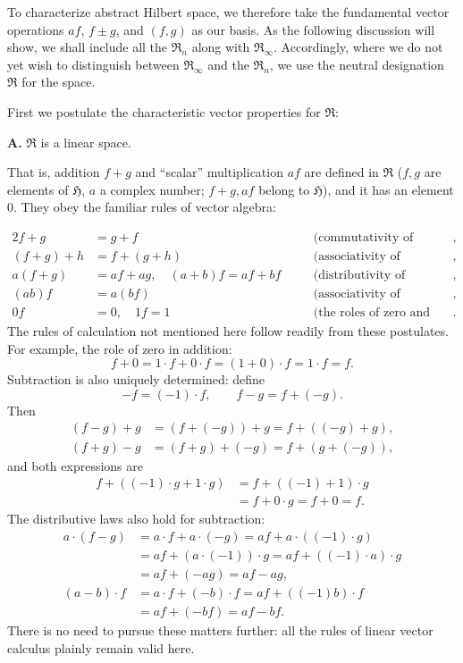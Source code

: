 \documentclass[fontsize=13pt,twoside,openany,headings=normal,parskip=false,bookmarkpackage=false,DIV=calc]{scrbook}
\begin{document}
To characterize abstract Hilbert space, we therefore take the fundamental vector operations $af$, $f\pm g$, and $(f,g)$ as our basis. As the following discussion will show, we shall include all the $\mathfrak{R}_n$ along with $\mathfrak{R}_\infty$. Accordingly, where we do not yet wish to distinguish between $\mathfrak{R}_\infty$ and the $\mathfrak{R}_n$, we use the neutral designation $\mathfrak{R}$ for the space.

First we postulate the characteristic vector properties for $\mathfrak{R}$:

\leavevmode{}\textbf{A.}\label{ax:II.A} $\mathfrak{R}$ is a linear space.

That is, addition $f+g$ and ``scalar'' multiplication $af$ are defined in $\mathfrak{R}$ ($f,g$ are elements of $\mathfrak{H}$, $a$ a complex number; $f+g,af$ belong to $\mathfrak{H}$), and it has an element $0$. They obey the familiar rules of vector algebra:

\hypertarget{origpage-20}{}%
\begin{alignat*}{2}
f+g&=g+f &\quad &\text{(commutativity of addition)},\\
(f+g)+h&=f+(g+h)&\quad &\text{(associativity of addition)},\\
a(f+g)&=af+ag,\quad (a+b)f=af+bf
&\quad &\text{(distributivity of multiplication)},\\
(ab)f&=a(bf)&\quad &\text{(associativity of multiplication)},\\
0f&=0,\quad 1f=1&\quad &\text{(the roles of zero and unity)}.
\end{alignat*}
The rules of calculation not mentioned here follow readily from these postulates. For example, the role of zero in addition:
\[
f+0=1\cdot f+0\cdot f=(1+0)\cdot f=1\cdot f=f.
\]
Subtraction is also uniquely determined: define
\[
-f=(-1)\cdot f,\qquad f-g=f+(-g).
\]
Then
\begin{align*}
(f-g)+g&=(f+(-g))+g=f+((-g)+g),\\
(f+g)-g&=(f+g)+(-g)=f+(g+(-g)),
\end{align*}
and both expressions are
\begin{align*}
f+((-1)\cdot g+1\cdot g)
&=f+((-1)+1)\cdot g\\
&=f+0\cdot g=f+0=f.
\end{align*}
The distributive laws also hold for subtraction:
\begin{align*}
a\cdot(f-g)&=a\cdot f+a\cdot(-g)=af+a\cdot((-1)\cdot g)\\
&=af+(a\cdot(-1))\cdot g=af+((-1)\cdot a)\cdot g\\
&=af+(-ag)=af-ag,\\
(a-b)\cdot f&=a\cdot f+(-b)\cdot f=af+((-1)b)\cdot f\\
&=af+(-bf)=af-bf.
\end{align*}
There is no need to pursue these matters further: all the rules of linear vector calculus plainly remain valid here.
\end{document}
